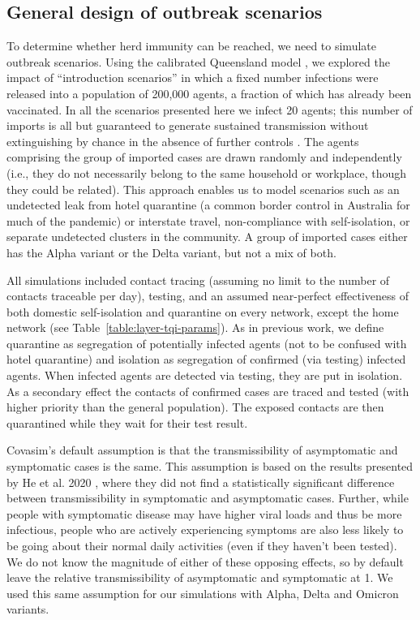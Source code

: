\documentclass[article, a4, authoryear]{elsarticle}
\begin{document}
\subsection{General design of outbreak scenarios}
\label{subsec:design}

To determine whether herd immunity can be reached, we need to simulate outbreak scenarios. Using the calibrated Queensland model \cite{sanz-leon2021qldmodel}, we explored the impact of ``introduction scenarios'' in which a fixed  number infections were released into a population of 200,000 agents, a fraction of which has already been vaccinated. In all the scenarios presented here we infect 20 agents; this number of imports is all but guaranteed to generate sustained transmission without extinguishing by chance in the absence of further controls \cite{sanz-leon2021qldmodel}. The agents comprising the group of imported cases are drawn randomly and independently (i.e., they do not necessarily belong to the same household or workplace, though they could be related). This approach enables us to model scenarios such as an undetected leak from hotel quarantine (a common border control in Australia for much of the pandemic) or interstate travel, non-compliance with self-isolation, or separate undetected clusters in the community. A group of imported cases either has the Alpha variant or the Delta variant, but not a mix of both. 

All simulations included contact tracing (assuming no limit to the number of contacts traceable per day), testing, and an assumed near-perfect effectiveness of both domestic self-isolation and quarantine on every network, except the home network (see Table~\ref{table:layer-tqi-params}). As in previous work, we define quarantine as segregation of potentially infected agents (not to be confused with hotel quarantine) and isolation as segregation of confirmed (via testing) infected agents. When infected agents are detected via testing, they are put in isolation. As a secondary effect the contacts of confirmed cases are traced and tested (with higher priority than the general population). The exposed contacts are then quarantined while they wait for their test result. 

Covasim's default assumption is that the transmissibility of asymptomatic and symptomatic cases is the same. This assumption is based on the results presented by He et al. 2020 \cite{he2020relative}, where they did not find a statistically significant difference between transmissibility in symptomatic and asymptomatic cases.
Further, while people with symptomatic disease may have higher viral loads and thus be more infectious, people who are actively experiencing symptoms are also less likely to be going about their normal daily activities (even if they haven't been tested). We do not know the magnitude of either of these opposing effects, so by default leave the relative transmissibility of asymptomatic and symptomatic at 1. We used this same assumption for our simulations with Alpha, Delta and Omicron variants. 
\end{document}

